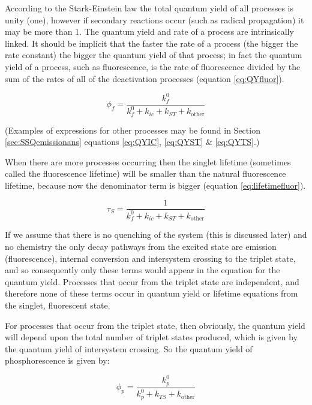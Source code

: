 \documentclass[
]{book}
\begin{document}
According to the Stark-Einstein law the total quantum yield of all processes is unity (one), however if secondary reactions occur (such as radical propagation) it may be more than 1. The quantum yield and rate of a process are intrinsically linked. It should be implicit that the faster the rate of a process (the bigger the rate constant) the bigger the quantum yield of that process; in fact the quantum yield of a process, such as fluorescence, is the rate of fluorescence divided by the sum of the rates of all of the deactivation processes (equation \eqref{eq:QYfluor}).

\begin{equation}
\phi_f = \frac{k_f^0}{k_f^0+k_{ic}+ k_{ST}+k_{\textrm{other}}}
\label{eq:QYfluor}
\end{equation}

(Examples of expressions for other processes may be found in Section \ref{sec:SSQemissionans} equations \eqref{eq:QYIC}, \eqref{eq:QYST} \& \eqref{eq:QYTS}.)

When there are more processes occurring then the singlet lifetime (sometimes called the fluorescence lifetime) will be smaller than the natural fluorescence lifetime, because now the denominator term is bigger (equation \eqref{eq:lifetimefluor}).

\begin{equation}
\tau_S = \frac{1}{k_f^0+k_{ic}+ k_{ST}+k_{\textrm{other}}}
\label{eq:lifetimefluor}
\end{equation}

If we assume that there is no quenching of the system (this is discussed later) and no chemistry the only decay pathways from the excited state are emission (fluorescence), internal conversion and intersystem crossing to the triplet state, and so consequently only these terms would appear in the equation for the quantum yield. Processes that occur from the triplet state are independent, and therefore none of these terms occur in quantum yield or lifetime equations from the singlet, fluorescent state.

For processes that occur from the triplet state, then obviously, the quantum yield will depend upon the total number of triplet states produced, which is given by the quantum yield of intersystem crossing. So the quantum yield of phosphorescence is given by:

\begin{equation}
\phi_p = \frac{k_p^0}{k_p^0+k_{TS}+k_{\textrm{other}}}
\label{eq:QYphos}
\end{equation}
\end{document}
